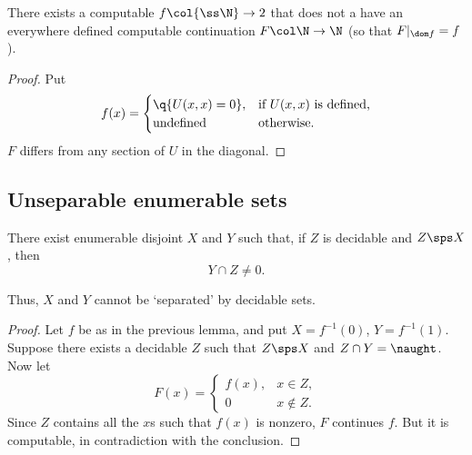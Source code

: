 \begin{lemma}
  There exists a computable $f \col {\ss \N} \to 2$ that does not a have an everywhere defined computable continuation $F \col \N \to \N$ (so that $F|_{\dom f} = f$). 
\end{lemma}

\begin{proof}
  Put
  $$
  f(x) = \begin{cases}
    \q{U(x,x) = 0}, & \text{if $U(x, x)$ is defined,}\\
    \und & \oth.
  \end{cases}
  $$
  $F$ differs from any section of $U$ in the diagonal.
\end{proof}

\subsection{Unseparable enumerable sets}

\begin{lemma}
  There exist enumerable disjoint $X$ and $Y$ such that, if $Z$ is decidable and $Z \sps X$, then
  $$ Y \cap Z \ne 0. $$ 
\end{lemma}

Thus, $X$ and $Y$ cannot be `separated' by decidable sets.

\begin{proof}
  Let $f$ be as in the previous lemma, and put $X = f^{-1}(0)$, $Y = f^{-1}(1)$.
  Suppose there exists a decidable $Z$ such that $Z \sps X$ and $Z \cap Y = \naught$. 
  Now let
  $$
  F(x)
  = \begin{cases}
    f(x), & x \in Z, \\
    0 & x \not\in Z.
  \end{cases}
  $$
  Since $Z$ contains all the $x$s such that $f(x)$ is nonzero, $F$ continues $f$.
  But it is computable, in contradiction with the conclusion.
\end{proof}
